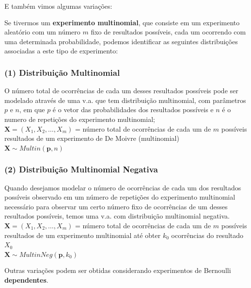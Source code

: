 \documentclass[
]{book}
\theoremstyle{definition}
\theoremstyle{definition}
\theoremstyle{definition}
\theoremstyle{remark}
\begin{document}
E também vimos algumas variações:

Se tivermos um \textbf{experimento multinomial}, que consiste em um experimento aleatório com um número \(m\) fixo de resultados possíveis, cada um ocorrendo com uma determinada probabilidade, podemos identificar as seguintes distribuições associadas a este tipo de experimento:

\hypertarget{distribuiuxe7uxe3o-multinomial-1}{%
\subsubsection*{(1) Distribuição Multinomial}\label{distribuiuxe7uxe3o-multinomial-1}}

O número total de ocorrências de cada um desses resultados possíveis pode ser modelado através de uma v.a. que tem distribuição multinomial, com parâmetros \(p\) e \(n\), em que \(p\) é o vetor das probabilidades dos resultados possíveis e \(n\) é o numero de repetições do experimento multinomial;\\
\(\mathbf{X} = (X_1, X_2, \ldots, X_m)\) = número total de ocorrências de cada um de \(m\) possíveis resultados de um experimento de De Moivre (multinomial)\\
\(\mathbf{X} \sim Multin (\mathbf{p}, n)\)

\hypertarget{distribuiuxe7uxe3o-multinomial-negativa-1}{%
\subsubsection*{(2) Distribuição Multinomial Negativa}\label{distribuiuxe7uxe3o-multinomial-negativa-1}}

Quando desejamos modelar o número de ocorrências de cada um dos resultados possíveis observado em um número de repetições do experimento multinomial necessário para observar um certo número fixo de ocorrências de um desses resultados possíveis, temos uma v.a. com distribuição multinomial negativa.\\
\(\mathbf{X} = (X_1, X_2, \ldots, X_m)\) = número total de ocorrências de cada um de \(m\) possíveis resultados de um experimento multinomial até obter \(k_0\) ocorrências do resultado \(X_0\)\\
\(\mathbf{X} \sim MultinNeg (\mathbf{p}, k_0)\)

Outras variações podem ser obtidas considerando experimentos de Bernoulli \textbf{dependentes}.
\end{document}

